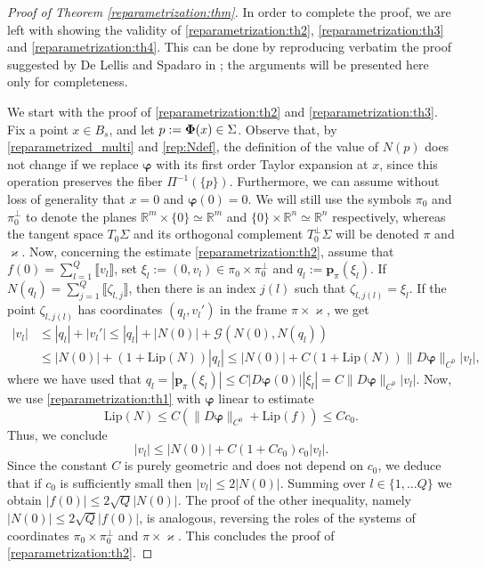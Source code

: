 \documentclass[a4paper,11pt,reqno]{amsart}
\theoremstyle{definition}
\numberwithin{equation}{section}
\numberwithin{subsection}{section}
\newcommand{\R}{\mathbb{R}}
\newcommand{\G}{\mathcal{G}}
\newcommand{\Lip}{\mathrm{Lip}}
\newcommand{\bphi}{\boldsymbol{\varphi}}
\newcommand{\p}{\mathbf{p}}
\begin{document}
\begin{proof}[Proof of Theorem \ref{reparametrization:thm}]
In order to complete the proof, we are left with showing the validity of \eqref{reparametrization:th2}, \eqref{reparametrization:th3} and \eqref{reparametrization:th4}. This can be done by reproducing verbatim the proof suggested by De Lellis and Spadaro in \cite{DLS13a}; the arguments will be presented here only for completeness.

We start with the proof of \eqref{reparametrization:th2} and \eqref{reparametrization:th3}. Fix a point $x \in B_{s}$, and let $p := {\bf \Phi}(x) \in \Sigma$. Observe that, by \eqref{reparametrized_multi} and \eqref{rep:Ndef}, the definition of the value of $N(p)$ does not change if we replace $\bphi$ with its first order Taylor expansion at $x$, since this operation preserves the fiber $\Pi^{-1}(\{p\})$. Furthermore, we can assume without loss of generality that $x = 0$ and $\bphi(0) = 0$. We will still use the symbols $\pi_{0}$ and $\pi_{0}^{\perp}$ to denote the planes $\R^{m} \times \{0\} \simeq \R^{m}$ and $\{0\} \times \R^{n} \simeq \R^{n}$ respectively, whereas the tangent space $T_{0}\Sigma$ and its orthogonal complement $T_{0}^{\perp}\Sigma$ will be denoted $\pi$ and $\varkappa$. 
Now, concerning the estimate \eqref{reparametrization:th2}, assume that $f(0) = \sum_{l=1}^{Q} \llbracket v_{l} \rrbracket$, set $\xi_{l} := \left( 0, v_{l} \right) \in \pi_{0} \times \pi_{0}^{\perp}$ and $q_{l} := \p_{\pi}(\xi_{l})$. If $N(q_{l}) = \sum_{j=1}^{Q} \llbracket \zeta_{l,j} \rrbracket$, then there is an index $j(l)$ such that $\zeta_{l,j(l)} = \xi_{l}$. If the point $\zeta_{l,j(l)}$ has coordinates $\left( q_{l}, v_{l}' \right)$ in the frame $\pi \times \varkappa$, we get
\begin{equation}
\begin{split}
|v_{l}| &\leq |q_{l}| + |v_{l}'| \leq |q_{l}| + |N(0)| + \G(N(0), N(q_{l})) \\
&\leq |N(0)| + \left( 1 + \Lip(N) \right) |q_{l}| \leq |N(0)| + C \left( 1 + \Lip(N) \right) \| D \bphi \|_{C^0} |v_{l}|,
\end{split}
\end{equation} 
where we have used that $q_{l} = |\p_{\pi}(\xi_{l})| \leq C |D \bphi(0)| |\xi_{l}| = C \| D \bphi \|_{C^{0}} |v_{l}|$. Now, we use \eqref{reparametrization:th1} with $\bphi$ linear to estimate
\begin{equation}
\Lip(N) \leq C \left( \| D \bphi \|_{C^{0}} + \Lip(f) \right) \leq C c_{0}.
\end{equation}
Thus, we conclude
\begin{equation}
|v_{l}| \leq |N(0)| + C (1 + C c_{0}) c_{0} |v_{l}|.
\end{equation}
Since the constant $C$ is purely geometric and does not depend on $c_{0}$, we deduce that if $c_{0}$ is sufficiently small then $|v_{l}| \leq 2 |N(0)|$. Summing over $l \in \{ 1, \dots Q \}$ we obtain $|f(0)| \leq 2 \sqrt{Q} |N(0)|$. The proof of the other inequality, namely $|N(0)| \leq 2 \sqrt{Q} |f(0)|$, is analogous, reversing the roles of the systems of coordinates $\pi_{0} \times \pi_{0}^{\perp}$ and $\pi \times \varkappa$. This concludes the proof of \eqref{reparametrization:th2}.


\end{proof}
\end{document}
